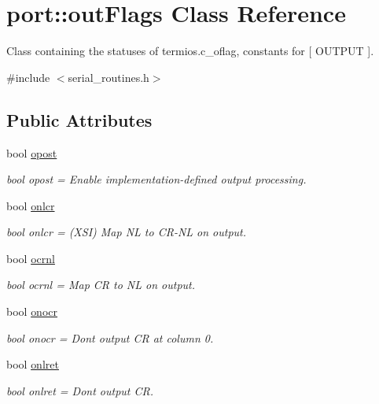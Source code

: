 \hypertarget{classport_1_1outFlags}{}\section{port\+:\+:out\+Flags Class Reference}
\label{classport_1_1outFlags}


Class containing the statuses of termios.\+c\+\_\+oflag, constants for \mbox{[} O\+U\+T\+P\+UT \mbox{]}.  




{\ttfamily \#include $<$serial\+\_\+routines.\+h$>$}

\subsection*{Public Attributes}
\begin{DoxyCompactItemize}
\item 
bool \hyperlink{classport_1_1outFlags_a11cd5d176cbfcee504f49db3ed8a1f44}{opost}
\begin{DoxyCompactList}\small\item\em bool opost = Enable implementation-\/defined output processing. \end{DoxyCompactList}\item 
bool \hyperlink{classport_1_1outFlags_a57f996933d316ad79637030e2cb06898}{onlcr}
\begin{DoxyCompactList}\small\item\em bool onlcr = (X\+SI) Map NL to C\+R-\/\+NL on output. \end{DoxyCompactList}\item 
bool \hyperlink{classport_1_1outFlags_a70a63948b2b1f2d1a33c14861938105d}{ocrnl}
\begin{DoxyCompactList}\small\item\em bool ocrnl = Map CR to NL on output. \end{DoxyCompactList}\item 
bool \hyperlink{classport_1_1outFlags_abd2808b0c96c90d378a567de95416db8}{onocr}
\begin{DoxyCompactList}\small\item\em bool onocr = Don\textquotesingle{}t output CR at column 0. \end{DoxyCompactList}\item 
bool \hyperlink{classport_1_1outFlags_a0aa44f8e847dc5d6392973e255946079}{onlret}
\begin{DoxyCompactList}\small\item\em bool onlret = Don\textquotesingle{}t output CR. \end{DoxyCompactList}\item 

\end{DoxyCompactItemize}
